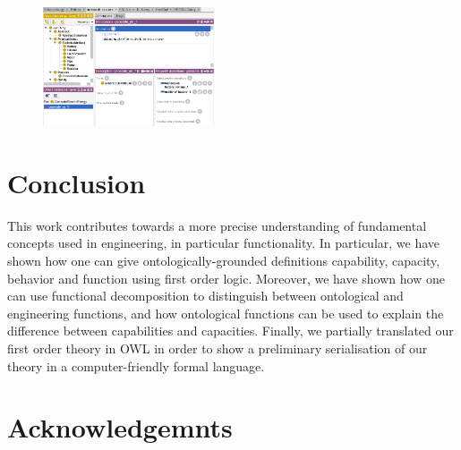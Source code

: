 \documentclass[sw]{iosart2x}
\newcommand{\OWL}{\textnormal{OWL}\xspace}
\begin{document}
\begin{figure}
  \centering
  \includegraphics[width=0.45\textwidth]{entities_screenshot.PNG}
  \caption{\label{fig:screen_entities}}
\end{figure}

\section{Conclusion}\label{sec:conc}
This work contributes towards a more precise understanding of fundamental concepts used in engineering, in particular functionality.
In particular, we have shown how one can give ontologically-grounded definitions capability, capacity, behavior and function using first order logic.
Moreover, we have shown how one can use functional decomposition to distinguish between ontological and engineering functions, and how ontological functions can be used to explain the difference between capabilities and capacities.
Finally, we partially translated our first order theory in \OWL in order to show a preliminary serialisation of our theory in a computer-friendly formal language.



\section*{Acknowledgemnts}

\end{document}
